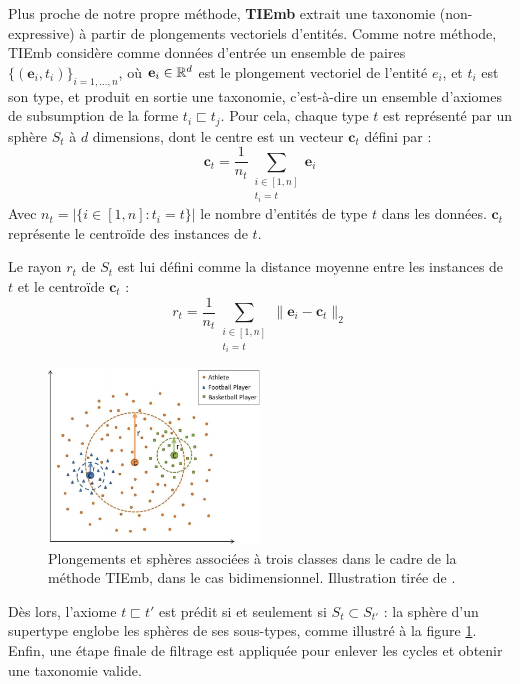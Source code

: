 \label{subsec:litt-tiemb}


Plus proche de notre propre méthode, \textbf{TIEmb} \cite{ristoski2017large} extrait une taxonomie (non-expressive) à partir de plongements vectoriels d'entités. Comme notre méthode, TIEmb considère comme données d'entrée un ensemble de paires $\{(\textbf{e}_i, t_i) \}_{i=1, \ldots, n}$, où $\textbf{e}_i \in \mathbb{R}^d$ est le plongement vectoriel de l'entité $e_i$, et $t_i$ est son type, et produit en sortie une taxonomie, c'est-à-dire un ensemble d'axiomes de subsumption de la forme $t_i \sqsubset t_j$. Pour cela, chaque type $t$ est représenté par un sphère $S_t$ à $d$ dimensions, dont le centre est un vecteur $\textbf{c}_t$ défini par :
\begin{equation}
 \textbf{c}_t = \frac{1}{n_t} \sum_{\substack{i \in [1, n] \\ t_i = t}} \textbf{e}_i
\end{equation}
Avec $n_t = |\{ i \in [1, n] : t_i = t \}|$ le nombre d'entités de type $t$ dans les données. $\textbf{c}_t$ représente le centroïde des instances de $t$.

Le rayon $r_t$ de $S_t$ est lui défini comme la distance moyenne entre les instances de $t$ et le centroïde $\textbf{c}_t$ :
\begin{equation}
    r_t = \frac{1}{n_t}  \sum_{\substack{i \in [1, n] \\ t_i = t}} \| \textbf{e}_i - \textbf{c}_t \|_2
\end{equation}


\begin{figure}[h]
    \centering
    \includegraphics[width=0.5\textwidth]{img/tiemb.png}
    \caption[Principe général de TIEmb]{Plongements et sphères associées à trois classes dans le cadre de la méthode TIEmb, dans le cas bidimensionnel. Illustration tirée de \cite{ristoski2017large}.}
    \label{fig:litt-tiemb}
\end{figure}


Dès lors, l'axiome $t \sqsubset t'$ est prédit si et seulement si $S_t \subset S_{t'}$ : la sphère d'un supertype englobe les sphères de ses sous-types, comme illustré à la figure \ref{fig:litt-tiemb}. Enfin, une étape finale de filtrage est appliquée pour enlever les cycles et obtenir une taxonomie valide. 

